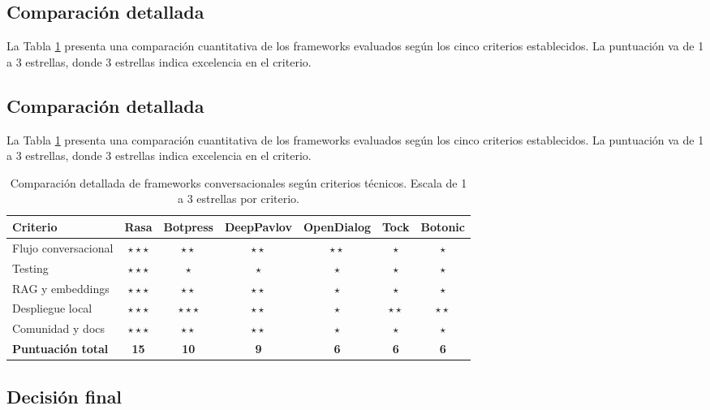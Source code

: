 \subsection{Comparación detallada}

La Tabla \ref{tab:comp-frameworks-detallada} presenta una comparación cuantitativa de los frameworks evaluados según los cinco criterios establecidos. La puntuación va de 1 a 3 estrellas, donde 3 estrellas indica excelencia en el criterio.

\subsection{Comparación detallada}

La Tabla \ref{tab:comp-frameworks-detallada} presenta una comparación cuantitativa de los frameworks evaluados según los cinco criterios establecidos. La puntuación va de 1 a 3 estrellas, donde 3 estrellas indica excelencia en el criterio.

\begin{table}[h]
\centering
\begin{tabular}{|l|c|c|c|c|c|c|}
\hline
\textbf{Criterio} & \textbf{Rasa} & \textbf{Botpress} & \textbf{DeepPavlov} & \textbf{OpenDialog} & \textbf{Tock} & \textbf{Botonic} \\ \hline
Flujo conversacional & $\star\star\star$ & $\star\star$ & $\star\star$ & $\star\star$ & $\star$ & $\star$ \\ \hline
Testing & $\star\star\star$ & $\star$ & $\star$ & $\star$ & $\star$ & $\star$ \\ \hline
RAG y embeddings & $\star\star\star$ & $\star\star$ & $\star\star$ & $\star$ & $\star$ & $\star$ \\ \hline
Despliegue local & $\star\star\star$ & $\star\star\star$ & $\star\star$ & $\star$ & $\star\star$ & $\star\star$ \\ \hline
Comunidad y docs & $\star\star\star$ & $\star\star$ & $\star\star$ & $\star$ & $\star$ & $\star$ \\ \hline\hline
\textbf{Puntuación total} & \textbf{15} & \textbf{10} & \textbf{9} & \textbf{6} & \textbf{6} & \textbf{6} \\ \hline
\end{tabular}
\caption{Comparación detallada de frameworks conversacionales según criterios técnicos. Escala de 1 a 3 estrellas por criterio.}
\label{tab:comp-frameworks-detallada}
\end{table}

\subsection{Decisión final}

